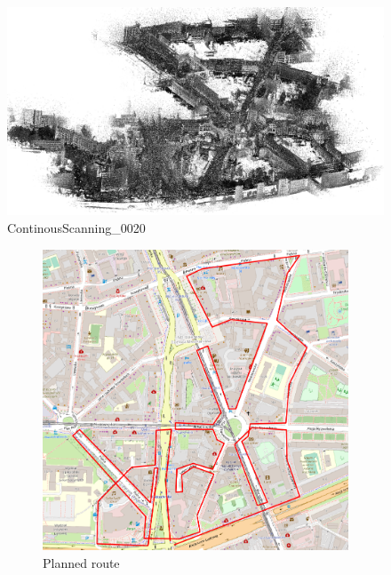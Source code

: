 \documentclass[a4paper,12pt]{book}
\begin{document}
\begin{enumerate}
	\begin{figure}[H]
		\includegraphics[width=1\linewidth]{cloud20}
		\caption{ContinousScanning\_0020}
	\end{figure}
	\begin{figure}[H]
		\centering
		\begin{subfigure}{.69\textwidth}
			\centering
			\includegraphics[width=1\linewidth]{route_p20}
			\caption{Planned route}
			\label{fig:a20}
		\end{subfigure}%
		\linebreak
		\begin{subfigure}{.69\textwidth}
			\centering

\end{subfigure}
\end{figure}
\end{enumerate}
\end{document}
